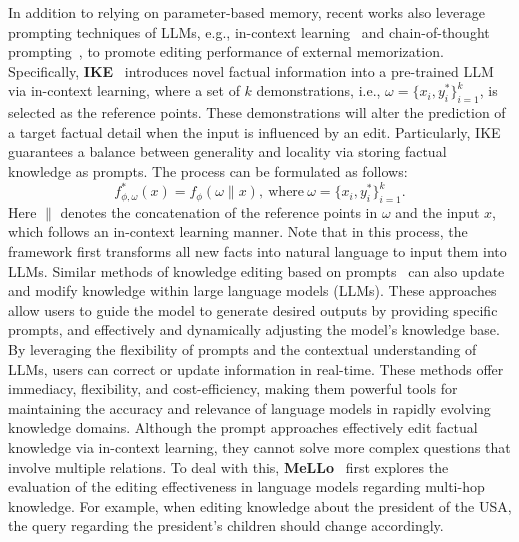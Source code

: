\documentclass[acmsmall, screen]{acmart}
\begin{document}

In addition to relying on parameter-based memory, recent works also leverage prompting techniques of LLMs, e.g., in-context learning~\cite{dong2022survey} and chain-of-thought prompting~\cite{wei2022chain}, to promote editing performance of external memorization.
Specifically,
\textbf{IKE}~\cite{IKE} introduces novel factual information into a pre-trained LLM via in-context learning, where a set of $k$ demonstrations, i.e., $\omega=\{x_{i}, y^{*}_{i}\}_{i=1}^{k}$, is selected as the reference points. These demonstrations will alter the prediction of a target factual detail when the input is influenced by an edit. Particularly, IKE guarantees a balance between generality and locality via storing factual knowledge as prompts. The process can be formulated as follows:
\begin{equation}
f^*_{\phi, \omega}(x)=f_\phi( \omega \| x),\ \text{where}\ \omega=\{x_{i}, y^{*}_{i}\}_{i=1}^{k}.
\end{equation}
Here $\|$ denotes the concatenation of the reference points in $\omega$ and the input $x$, which follows an in-context learning manner. Note that in this process, the framework first transforms all new facts into natural language to input them into LLMs. {Similar methods of knowledge editing based on prompts~\cite{p1,p2,p3,p4} can also update and modify knowledge within large language models (LLMs). These approaches allow users to guide the model to generate desired outputs by providing specific prompts, and effectively and dynamically adjusting the model's knowledge base. By leveraging the flexibility of prompts and the contextual understanding of LLMs, users can correct or update information in real-time. These methods offer immediacy, flexibility, and cost-efficiency, making them powerful tools for maintaining the accuracy and relevance of language models in rapidly evolving knowledge domains.} Although the prompt approaches effectively edit factual knowledge via in-context learning, they cannot solve more complex questions that involve multiple relations. To deal with this, \textbf{MeLLo}~\cite{MQuAKE} first explores the evaluation of the editing effectiveness in language models regarding multi-hop knowledge. For example, when editing knowledge about the president of the USA, the query regarding the president's children should change accordingly. %
\end{document}

